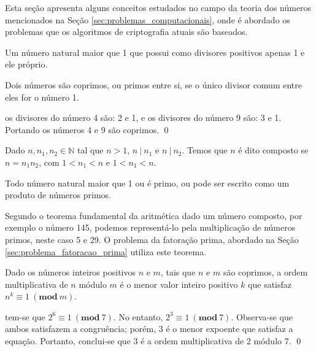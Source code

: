     Esta seção apresenta alguns conceitos estudados no campo da teoria dos números mencionados na Seção \ref{sec:problemas_computacionais}, onde é abordado os problemas que os algoritmos de criptografia atuais são baseados.

    \begin{definition}
        Um número natural maior que 1 que possui como divisores positivos apenas 1 e ele próprio.
    \end{definition}

    \begin{definition}[coprimos]
        Dois números são coprimos, ou primos entre si, se o único divisor comum entre eles for o número 1.
    \end{definition}

    \begin{exemplo}
        os divisores do número 4 são: 2 e 1, e os divisores do número 9 são: 3 e 1. Portando os números 4 e 9 são coprimos.
    \qed
    \end{exemplo}
   

    \begin{definition}
        Dado $n,n_1,n_2 \in \mathbb{N}$ tal que $n > 1$, $n\ |\ n_1$ e $n\ |\ n_2$. Temos que $n$ é dito composto se $n = n_1 n_2$, com $1 < n_1 < n$ e $1 < n_1 < n$. 
    \end{definition}

    \begin{theorem}
        Todo número natural maior que 1 ou é primo, ou pode ser escrito como um produto de números primos.
    \end{theorem}

    Segundo o teorema fundamental da aritmética dado um número composto, por exemplo o número 145, podemos representá-lo pela multiplicação de números primos, neste caso 5 e 29. O problema da fatoração prima, abordado na Seção \ref{sec:problema_fatoracao_prima} utiliza este teorema.

    \begin{definition}
        Dado os números inteiros positivos $n$ e $m$, tais que $n$ e $m$ são coprimos, a ordem multiplicativa de $n$ módulo $m$ é o menor valor inteiro positivo $k$ que satisfaz $n^k \equiv 1\ (\textbf{mod}\ m)$.
    \end{definition}

    \begin{exemplo}
        tem-se que \(2^6 \equiv 1\ (\textbf{mod}\ 7)\). No entanto, \(2^3 \equiv 1\ (\textbf{mod}\ 7)\). Observa-se que ambos satisfazem a congruência; porém, 3 é o menor expoente que satisfaz a equação. Portanto, conclui-se que 3 é a ordem multiplicativa de 2 módulo 7.
    \qed
    \end{exemplo}

